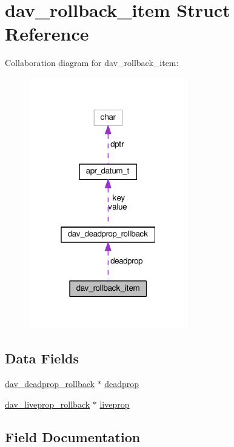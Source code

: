 \hypertarget{structdav__rollback__item}{}\section{dav\+\_\+rollback\+\_\+item Struct Reference}
\label{structdav__rollback__item}


Collaboration diagram for dav\+\_\+rollback\+\_\+item\+:
\nopagebreak
\begin{figure}[H]
\begin{center}
\leavevmode
\includegraphics[width=196pt]{structdav__rollback__item__coll__graph}
\end{center}
\end{figure}
\subsection*{Data Fields}
\begin{DoxyCompactItemize}
\item 
\hyperlink{structdav__deadprop__rollback}{dav\+\_\+deadprop\+\_\+rollback} $\ast$ \hyperlink{structdav__rollback__item_a7aa7214be00cef1a9e72db26237aa166}{deadprop}
\item 
\hyperlink{group__MOD__DAV_gafa19778d61300befd3b972a18cd564d5}{dav\+\_\+liveprop\+\_\+rollback} $\ast$ \hyperlink{structdav__rollback__item_a2c330bd7bd664fc84b2a8fcbc2bcb61b}{liveprop}
\end{DoxyCompactItemize}


\subsection{Field Documentation}
